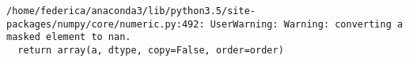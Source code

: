 \documentclass[11pt]{article}
\begin{document}
    \begin{Verbatim}[commandchars=\\\{\}]
/home/federica/anaconda3/lib/python3.5/site-packages/numpy/core/numeric.py:492: UserWarning: Warning: converting a masked element to nan.
  return array(a, dtype, copy=False, order=order)

    \end{Verbatim}

    \begin{center}
    \end{center}
    { \hspace*{\fill} \\}
    

    
    
    
    
\end{document}
